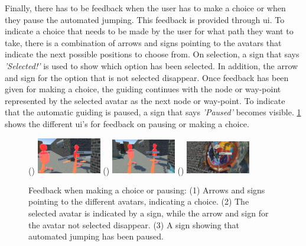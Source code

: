 Finally, there has to be feedback when the user has to make a choice or when they pause the automated jumping. This feedback is provided through \acrfull{ui}. To indicate a choice that needs to be made by the user for what path they want to take, there is a combination of arrows and signs pointing to the avatars that indicate the next possible positions to choose from. On selection, a sign that says \textit{'Selected!'} is used to show which option has been selected. In addition, the arrow and sign for the option that is not selected disappear. Once feedback has been given for making a choice, the guiding continues with the node or way-point represented by the selected avatar as the next node or way-point. To indicate that the automatic guiding is paused, a sign that says \textit{'Paused'} becomes visible. \cref{fig:automated-jumping-feedback-ui} shows the different \acrshort{ui}'s for feedback on pausing or making a choice. 

\begin{figure}[]
	\centering
	() {\includegraphics[width=0.25\textwidth]{images/choose.pdf}}
	() {\includegraphics[width=0.25\textwidth]{images/choice-made.pdf}}
	() {\includegraphics[width=0.25\textwidth]{images/paused.pdf}} 
	\caption{Feedback when making a choice or pausing: (1) Arrows and signs pointing to the different avatars, indicating a choice. (2) The selected avatar is indicated by a sign, while the arrow and sign for the avatar not selected disappear. (3) A sign showing that automated jumping has been paused.}
	\label{fig:automated-jumping-feedback-ui}
\end{figure} 


